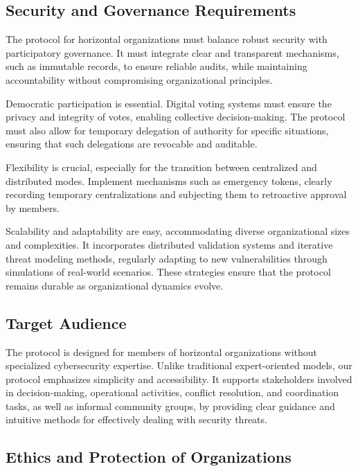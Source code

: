 \subsection{Security and Governance Requirements}
\label{subsec:security_governance_requirements}

The protocol for horizontal organizations must balance robust security with
participatory governance. It must integrate clear and transparent mechanisms,
such as immutable records, to ensure reliable audits, while maintaining
accountability without compromising organizational principles.

Democratic participation is essential. Digital voting systems must ensure the
privacy and integrity of votes, enabling collective decision-making. The
protocol must also allow for temporary delegation of authority for specific
situations, ensuring that such delegations are revocable and auditable.

Flexibility is crucial, especially for the transition between centralized and
distributed modes. Implement mechanisms such as emergency tokens, clearly
recording temporary centralizations and subjecting them to retroactive approval
by members.

Scalability and adaptability are easy, accommodating diverse organizational
sizes and complexities. It incorporates distributed validation systems and
iterative threat modeling methods, regularly adapting to new vulnerabilities
through simulations of real-world scenarios. These strategies ensure that the
protocol remains durable as organizational dynamics evolve.

\subsection{Target Audience}
\label{subsec:target_audience}

The protocol is designed for members of horizontal organizations without
specialized cybersecurity expertise. Unlike traditional expert-oriented models,
our protocol emphasizes simplicity and accessibility. It supports stakeholders
involved in decision-making, operational activities, conflict resolution, and
coordination tasks, as well as informal community groups, by providing clear
guidance and intuitive methods for effectively dealing with security threats.

\subsection{Ethics and Protection of Organizations}
\label{subsec:ethics_protection}

